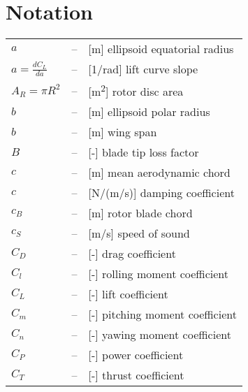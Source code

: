 \clearpage %
{}
\chapter*{Notation}
\markright{}

\begin{longtable}[l]{ l l p{} }
  $a$                                                    & -- & [m] ellipsoid equatorial radius \\
  $a=\frac{dC_L}{da}$                                    & -- & [1/rad] lift curve slope \\
  $A_R=\pi R^2$                                          & -- & [m\textsuperscript{2}] rotor disc area \\
  $b$                                                    & -- & [m] ellipsoid polar radius \\
  $b$                                                    & -- & [m] wing span \\
  $B$                                                    & -- & [-] blade tip loss factor \\
  $c$                                                    & -- & [m] mean aerodynamic chord \\
  $c$                                                    & -- & [N/(m/s)] damping coefficient \\
  $c_B$                                                  & -- & [m] rotor blade chord \\
  $c_S$                                                  & -- & [m/s] speed of sound \\
  $C_D$                                                  & -- & [-] drag coefficient \\
  $C_l$                                                  & -- & [-] rolling moment coefficient \\
  $C_L$                                                  & -- & [-] lift coefficient \\
  $C_m$                                                  & -- & [-] pitching moment coefficient \\
  $C_n$                                                  & -- & [-] yawing moment coefficient \\
  $C_P$                                                  & -- & [-] power coefficient \\
  $C_T$                                                  & -- & [-] thrust coefficient \\

\end{longtable}
